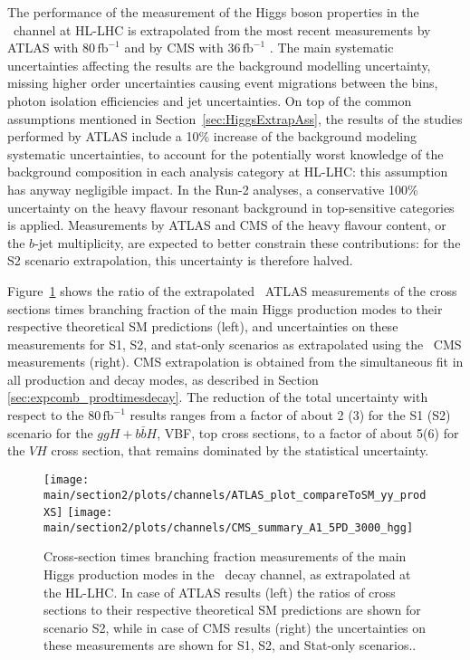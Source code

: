 The performance of the measurement of the Higgs boson properties in the \Hyy\ channel at HL-LHC is extrapolated from the most recent measurements by ATLAS with 80\,$\mathrm{fb}^{-1}$ \cite{ATLAS:2018uso} and by CMS with 36\,$\mathrm{fb}^{-1}$ \cite{Sirunyan:2018ouh}. The main systematic uncertainties affecting the results are the background modelling uncertainty,
missing higher order uncertainties
causing event migrations between the bins, photon isolation efficiencies and jet uncertainties.
%
On top of the common assumptions mentioned in Section~\ref{sec:HiggsExtrapAss}, the %
results of the studies performed by ATLAS include a 10\% increase of the background modeling systematic uncertainties, to account for the potentially worst knowledge of the background composition in each analysis category at HL-LHC: this assumption has anyway negligible impact.
%
In the Run-2 analyses, a conservative 100\% uncertainty on the heavy flavour resonant background in top-sensitive categories is applied. Measurements by ATLAS and CMS of the heavy flavour content, or the $b$-jet multiplicity, are expected to better constrain these contributions: for the S2 scenario extrapolation, this uncertainty is therefore halved.

Figure~\ref{fig:Hyy_ATLAS_HLLHC_S2} shows the ratio of the extrapolated \Hyy\ ATLAS measurements of the cross sections times branching fraction of the main Higgs production modes to their respective theoretical SM predictions (left), and uncertainties on these measurements for S1, S2, and stat-only scenarios as extrapolated using the \Hyy\ CMS measurements (right). CMS extrapolation is obtained from the simultaneous fit in all production and decay modes, as described in Section \ref{sec:expcomb_prodtimesdecay}. The reduction of the total uncertainty with respect to the 80\,$\mathrm{fb}^{-1}$ results ranges from a factor of about 2 (3) for the S1 (S2) scenario for the $ggH+b\bar{b}H$, VBF, top cross sections, to a factor of about 5(6) for the $VH$ cross section, that remains dominated by the statistical uncertainty.

\begin{figure}
  \centering
  \texttt{[image: \\main/section2/plots/channels/ATLAS\_plot\_compareToSM\_yy\_prodXS]}
  \texttt{[image: \\main/section2/plots/channels/CMS\_summary\_A1\_5PD\_3000\_hgg]}
  \caption{Cross-section times branching fraction measurements of the main Higgs production modes in the \Hyy\ decay channel, as extrapolated at the HL-LHC. In case of ATLAS results (left) the ratios of cross sections to their respective theoretical SM predictions are shown for scenario S2, while in case of CMS results (right) the uncertainties on these measurements are shown for S1, S2, and Stat-only scenarios..}
  \label{fig:Hyy_ATLAS_HLLHC_S2}
\end{figure}


